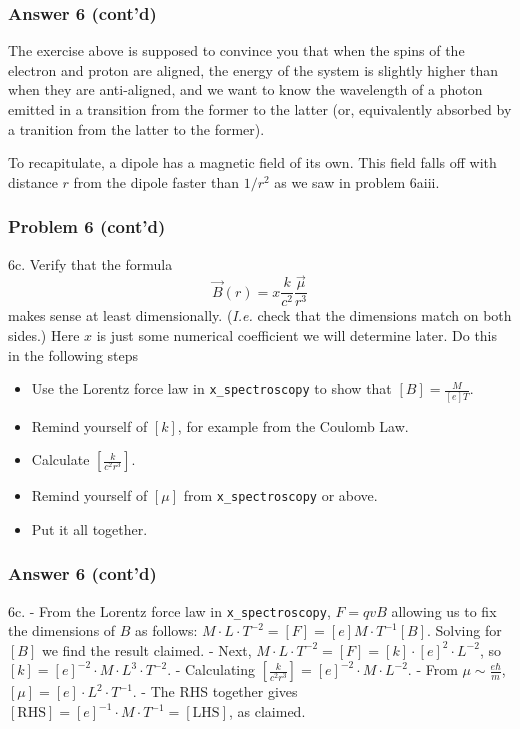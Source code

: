 \documentclass[11pt]{article}
\providecommand{\tightlist}{%
      \setlength{\itemsep}{0pt}\setlength{\parskip}{0pt}}
\begin{document}
\subsubsection{Answer 6 (cont'd)}\label{answer-6-contd}


    The exercise above is supposed to convince you that when the spins of
the electron and proton are aligned, the energy of the system is
slightly higher than when they are anti-aligned, and we want to know the
wavelength of a photon emitted in a transition from the former to the
latter (or, equivalently absorbed by a tranition from the latter to the
former).

To recapitulate, a dipole has a magnetic field of its own. This field
falls off with distance \(r\) from the dipole faster than \(1/r^2\) as
we saw in problem 6aiii.

 
\subsubsection{Problem 6 (cont'd)}\label{problem-6-contd}

6c. Verify that the formula \[
{\vec B}(r) = x \frac {k}{c^2} \frac {\vec \mu}{r^3}
\] makes sense at least dimensionally. (\emph{I.e.} check that the
dimensions match on both sides.) Here \(x\) is just some numerical
coefficient we will determine later. Do this in the following steps

\begin{itemize}
\tightlist
\item
  Use the Lorentz force law in \texttt{x\_spectroscopy} to show that
  \([B]=\frac{M}{[e]T}\).
\item
  Remind yourself of \([k]\), for example from the Coulomb Law.
\item
  Calculate \(\left[ \frac {k}{c^2 r^3} \right]\).
\item
  Remind yourself of \([\mu]\) from \texttt{x\_spectroscopy} or above.
\item
  Put it all together.
\end{itemize}
 

     
\subsubsection{Answer 6 (cont'd)}\label{answer-6-contd}

6c. - From the Lorentz force law in \texttt{x\_spectroscopy}, \(F=qvB\)
allowing us to fix the dimensions of \(B\) as follows:
\(M\cdot L\cdot T^{-2} = [F]= [e] M\cdot T^{-1}[B]\). Solving for
\([B]\) we find the result claimed. - Next,
\(M\cdot L\cdot T^{-2} = [F] = [k]\cdot [e]^2 \cdot L^{-2}\), so
\([k]= [e]^{-2}\cdot M\cdot L^3\cdot T^{-2}\). - Calculating
\(\left[ \frac {k}{c^2 r^3} \right] = [e]^{-2}\cdot M\cdot L^{-2}\). -
From $\mu \sim \frac {e\hbar}m $, $[\mu]=[e]\cdot L^2 \cdot T^{-1}$.
- The RHS together gives
\([\textrm{RHS}]= [e]^{-1}\cdot M\cdot T^{-1}= [\textrm{LHS}]\), as
claimed.
 
\end{document}
